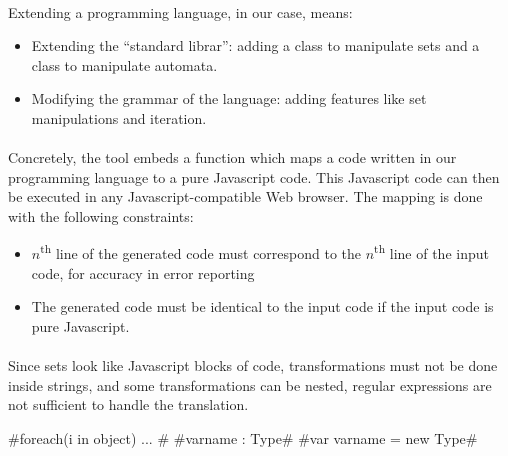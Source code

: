\paragraph{}
Extending a programming language, in our case, means:
       
\begin{itemize}
   \item{Extending the ``standard librar'': adding a class to manipulate sets and a class to manipulate automata.}
   \item{Modifying the grammar of the language: adding features like set manipulations and iteration.}
\end{itemize}

\paragraph{}
Concretely, the tool embeds a function which maps a code written in our programming language to a pure Javascript code. This Javascript code can then be executed in any Javascript-compatible Web browser.
The mapping is done with the following constraints:
\begin{itemize}
   \item{ $ n $\textsuperscript{th} line  of the generated code must correspond to the $ n $\textsuperscript{th}  line of the input code, for accuracy in error reporting}
   \item{ The generated code must be identical to the input code if the input code is pure Javascript.}
\end{itemize}

\paragraph{}
Since sets look like Javascript blocks of code, transformations must not be done inside strings, and some transformations can be nested, regular expressions are not sufficient to handle the translation.

\DefineShortVerb{\#}
#foreach(i in object) { ... }#
#varname : Type#
#var varname = new Type#
\UndefineShortVerb{\#}

\lstset{numbers=none, frame=none}

